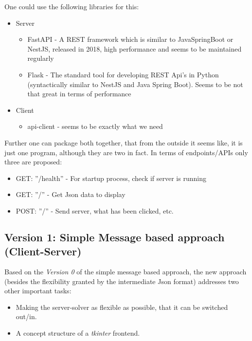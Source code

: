 \documentclass[12pt,a4paper]{article}
\newcommand{\<}[1]{\guilsinglleft}
\renewcommand{\>}[1]{\guilsinglright}
\begin{document}
\noindent One could use the following libraries for this:

\begin{itemize}
    \item Server
        \begin{itemize}
            \item FastAPI - A REST framework which is similar to JavaSpringBoot or NestJS, released in 2018, high performance and seems to be maintained regularly
            \item Flask - The standard tool for developing REST Api's in Python (syntactically similar to NestJS and Java Spring Boot). Seems to be not that great in terms of performance
        \end{itemize}
    \item Client
        \begin{itemize}
            \item api-client - seems to be exactly what we need 
        \end{itemize}
\end{itemize}

\noindent Further one can package both together, that from the outside it seems like, it is just one program, although they are two in fact. In terms of endpoints/APIs only three are proposed:

\begin{itemize}
    \item GET: ''/health'' - For startup process, check if server is running
    \item GET: ''/'' - Get Json data to display
    \item POST: ''/'' - Send server, what has been clicked, etc.
\end{itemize}

\newpage
\subsection{Version 1: Simple Message based approach (Client-Server)}

\noindent Based on the \textit{Version 0} of the simple message based approach, the new approach (besides the flexibility granted by the intermediate Json format) addresses two other important tasks:

\begin{itemize}
    \item Making the server-solver as flexible as possible, that it can be switched out/in.
    \item A concept structure of a \textit{tkinter} frontend.
\end{itemize}
\end{document}
